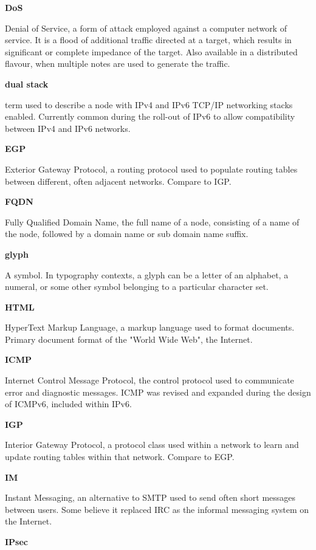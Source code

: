 \textbf{DoS}

Denial of Service, a form of attack employed against a computer network
of service. It is a flood of additional traffic directed at a target,
which results in significant or complete impedance of the target. Also
available in a distributed flavour, when multiple notes are used to
generate the traffic.

\textbf{dual stack}

term used to describe a node with IPv4 and IPv6 TCP/IP networking stacks
enabled. Currently common during the roll-out of IPv6 to allow
compatibility between IPv4 and IPv6 networks.

\textbf{EGP}

Exterior Gateway Protocol, a routing protocol used to populate routing
tables between different, often adjacent networks. Compare to IGP.

\textbf{FQDN}

Fully Qualified Domain Name, the full name of a node, consisting of a
name of the node, followed by a domain name or sub domain name suffix.

\textbf{glyph}

A symbol. In typography contexts, a glyph can be a letter of an
alphabet, a numeral, or some other symbol belonging to a particular
character set.

\textbf{HTML}

HyperText Markup Language, a markup language used to format documents.
Primary document format of the "World Wide Web", the Internet.

\textbf{ICMP}

Internet Control Message Protocol, the control protocol used to
communicate error and diagnostic messages. ICMP was revised and expanded 
during the design of ICMPv6, included within IPv6.

\textbf{IGP}

Interior Gateway Protocol, a protocol class used within a network to
learn and update routing tables within that network. Compare to EGP.

\textbf{IM}

Instant Messaging, an alternative to SMTP used to send often short
messages between users. Some believe it replaced IRC as the informal
messaging system on the Internet. 

\textbf{IPsec}

